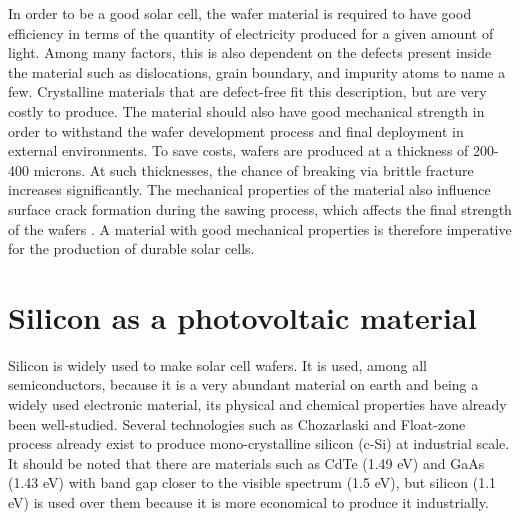
In order to be a good solar cell, the wafer material is required to have good efficiency in terms of the quantity of electricity produced for a given amount of light. Among many factors, this is also dependent on the defects present inside the material such as dislocations, grain boundary, and impurity atoms to name a few. Crystalline materials that are defect-free fit this description, but are very costly to produce. The material should also have good mechanical strength in order to withstand the wafer development process and final deployment in external environments. To save costs, wafers are produced at a thickness of 200-400 microns. At such thicknesses, the chance of breaking via brittle fracture increases significantly. The mechanical properties of the material also influence surface crack formation during the sawing process, which affects the final strength of the wafers \cite{}. A material with good mechanical properties is therefore imperative for the production of durable solar cells.

\section{Silicon as a photovoltaic material}
Silicon is widely used to make solar cell wafers. It is used, among all semiconductors, because it is a very abundant material on earth and being a widely used electronic material, its physical and chemical properties have already been well-studied. Several technologies such as Chozarlaski and Float-zone process already exist to produce mono-crystalline silicon (c-Si) at industrial scale. It should be noted that there are materials such as CdTe (1.49 eV) and GaAs (1.43 eV) with band gap closer to the visible spectrum (1.5 eV), but silicon (1.1 eV) is used over them because it is more economical to produce it industrially.


